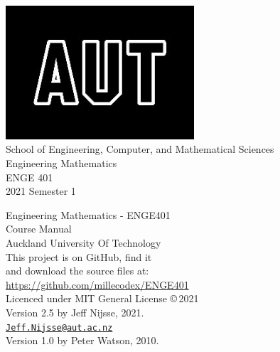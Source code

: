 \documentclass[a4paper,11pt,openany,oneside]{book}
\begin{document}
\frontmatter
\begin{titlepage}
\begin{center}

\includegraphics[width=7cm]{AUTlogo}\\
{\vspace{2cm}}
 {\Large School of Engineering, Computer, and Mathematical Sciences}
 \vspace{3cm}\\
 {\huge Engineering Mathematics}\\
 \vspace{1cm}
{\huge ENGE 401} \\
 \vspace{1cm}
{\huge 2021 Semester 1} \\
 \vfill
\end{center}
\end{titlepage}

\clearpage\thispagestyle{empty}
\vspace*{\fill}
Engineering Mathematics - ENGE401\\
Course Manual\\
Auckland University Of Technology\\

This project is on GitHub, find it \\
and download the source files at: \\
\url{https://github.com/millecodex/ENGE401} \\                            

Licenced under MIT General License \copyright \,2021 \\   

Version 2.5 by Jeff Nijsse, 2021.\\
\href{mailto:Jeff.Nijsse@aut.ac.nz}{\texttt{Jeff.Nijsse@aut.ac.nz}}\\
Version 1.0 by Peter Watson, 2010.

\clearpage
{}

%
\tableofcontents
\mainmatter








%
\end{document}
